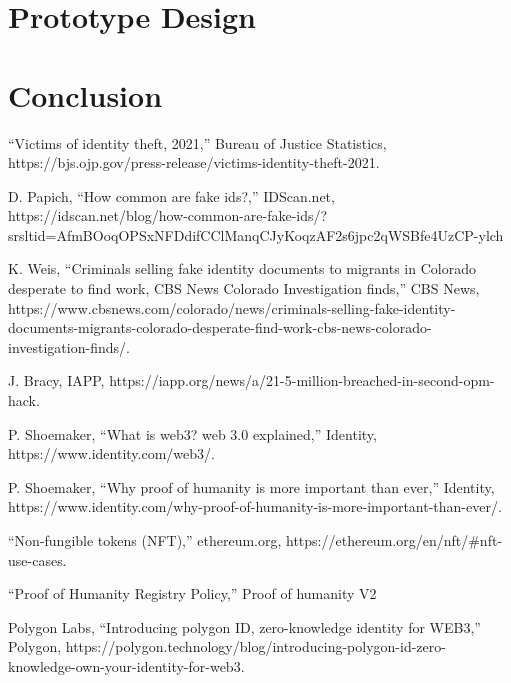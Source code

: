 \documentclass[conference]{IEEEtran}
\begin{document}
\section{Prototype Design}

\section{Conclusion}


\begin{thebibliography}{00}
“Victims of identity theft, 2021,” Bureau of Justice Statistics, https://bjs.ojp.gov/press-release/victims-identity-theft-2021. 

D. Papich, “How common are fake ids?,” IDScan.net,
https://idscan.net/blog/how-common-are-fake-ids/?srsltid=AfmBOoqOPSxNFDdifCClManqCJyKoqzAF2s6jpc2qWSBfe4UzCP-ylch

K. Weis, “Criminals selling fake identity documents to migrants in Colorado desperate to find work, CBS News Colorado Investigation finds,” CBS News, https://www.cbsnews.com/colorado/news/criminals-selling-fake-identity-documents-migrants-colorado-desperate-find-work-cbs-news-colorado-investigation-finds/. 

J. Bracy, IAPP, https://iapp.org/news/a/21-5-million-breached-in-second-opm-hack. 

P. Shoemaker, “What is web3? web 3.0 explained,” Identity, https://www.identity.com/web3/.

P. Shoemaker, “Why proof of humanity is more important than ever,” Identity, https://www.identity.com/why-proof-of-humanity-is-more-important-than-ever/.

“Non-fungible tokens (NFT),” ethereum.org, https://ethereum.org/en/nft/#nft-use-cases.

“Proof of Humanity Registry Policy,” Proof of humanity V2

Polygon Labs, “Introducing polygon ID, zero-knowledge identity for WEB3,” Polygon, https://polygon.technology/blog/introducing-polygon-id-zero-knowledge-own-your-identity-for-web3. 

\end{thebibliography}
\end{document}
